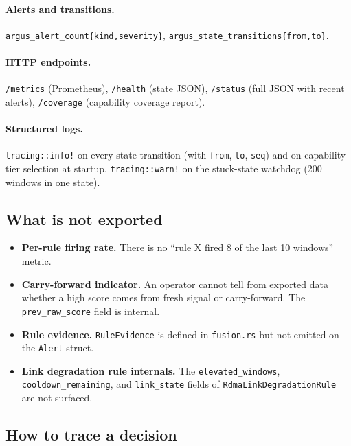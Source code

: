 \documentclass[11pt]{article}
\begin{document}
\paragraph{Alerts and transitions.}
\texttt{argus\_alert\_count\{kind,severity\}},
\texttt{argus\_state\_transitions\{from,to\}}.

\paragraph{HTTP endpoints.}
\texttt{/metrics} (Prometheus), \texttt{/health} (state JSON),
\texttt{/status} (full JSON with recent alerts), \texttt{/coverage}
(capability coverage report).

\paragraph{Structured logs.}
\texttt{tracing::info!} on every state transition (with \texttt{from},
\texttt{to}, \texttt{seq}) and on capability tier selection at startup.
\texttt{tracing::warn!} on the stuck-state watchdog (200 windows in one
state).

\subsection{What is not exported}

\begin{itemize}[nosep]
  \item \textbf{Per-rule firing rate.} There is no ``rule X fired 8 of the
        last 10 windows'' metric.
  \item \textbf{Carry-forward indicator.} An operator cannot tell from
        exported data whether a high score comes from fresh signal or
        carry-forward. The \texttt{prev\_raw\_score} field is internal.
  \item \textbf{Rule evidence.} \texttt{RuleEvidence} is defined in
        \texttt{fusion.rs} but not emitted on the \texttt{Alert} struct.
  \item \textbf{Link degradation rule internals.} The
        \texttt{elevated\_windows}, \texttt{cooldown\_remaining}, and
        \texttt{link\_state} fields of \texttt{RdmaLinkDegradationRule}
        are not surfaced.
\end{itemize}

\subsection{How to trace a decision}
\end{document}
